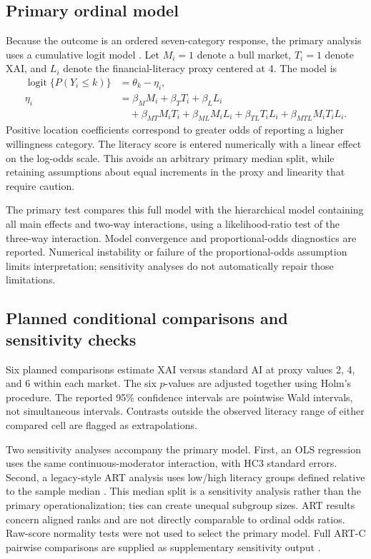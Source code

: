 \documentclass[11pt,a4paper]{article}
\begin{document}
\subsection{Primary ordinal model}
Because the outcome is an ordered seven-category response, the primary analysis uses a cumulative logit model \citep{christensen}. Let $M_i=1$ denote a bull market, $T_i=1$ denote XAI, and $L_i$ denote the financial-literacy proxy centered at 4. The model is
\begin{align}
\operatorname{logit}\{P(Y_i\leq k)\}&=\theta_k-\eta_i,\\
\eta_i&=\beta_M M_i+\beta_T T_i+\beta_L L_i\\
&\quad+\beta_{MT}M_iT_i+\beta_{ML}M_iL_i+\beta_{TL}T_iL_i
+\beta_{MTL}M_iT_iL_i .
\end{align}
Positive location coefficients correspond to greater odds of reporting a higher willingness category. The literacy score is entered numerically with a linear effect on the log-odds scale. This avoids an arbitrary primary median split, while retaining assumptions about equal increments in the proxy and linearity that require caution.

The primary test compares this full model with the hierarchical model containing all main effects and two-way interactions, using a likelihood-ratio test of the three-way interaction. Model convergence and proportional-odds diagnostics are reported. Numerical instability or failure of the proportional-odds assumption limits interpretation; sensitivity analyses do not automatically repair those limitations.

\subsection{Planned conditional comparisons and sensitivity checks}
Six planned comparisons estimate XAI versus standard AI at proxy values 2, 4, and 6 within each market. The six $p$-values are adjusted together using Holm's procedure. The reported 95\% confidence intervals are pointwise Wald intervals, not simultaneous intervals. Contrasts outside the observed literacy range of either compared cell are flagged as extrapolations.

Two sensitivity analyses accompany the primary model. First, an OLS regression uses the same continuous-moderator interaction, with HC3 standard errors. Second, a legacy-style ART analysis uses low/high literacy groups defined relative to the sample median \citep{wobbrock2011}. This median split is a sensitivity analysis rather than the primary operationalization; ties can create unequal subgroup sizes. ART results concern aligned ranks and are not directly comparable to ordinal odds ratios. Raw-score normality tests were not used to select the primary model. Full ART-C pairwise comparisons are supplied as supplementary sensitivity output \citep{elkin2021}.
\end{document}
